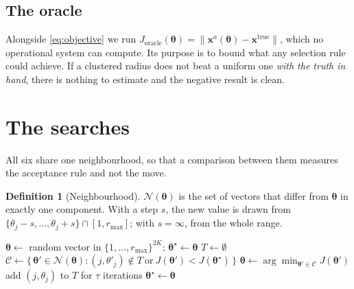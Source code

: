 \documentclass[11pt,a4paper]{article}
\theoremstyle{definition}
\newtheorem*{definition*}{Definition}
\newcommand{\xvec}{\mathbf{x}}
\begin{document}
\subsection{The oracle}

Alongside \eqref{eq:objective} we run
$J_{\text{oracle}}(\boldsymbol{\theta}) = \|\xvec^{a}(\boldsymbol{\theta})
- \xvec^{\text{true}}\|$, which no operational system can compute. Its purpose
is to bound what any selection rule could achieve. If a clustered radius does
not beat a uniform one \emph{with the truth in hand}, there is nothing to
estimate and the negative result is clean.

\section{The searches}

All six share one neighbourhood, so that a comparison between them measures the
acceptance rule and not the move.

\begin{definition*}[Neighbourhood]
$\mathcal{N}(\boldsymbol{\theta})$ is the set of vectors that differ from
$\boldsymbol{\theta}$ in exactly one component. With a step $s$, the new value
is drawn from $\{\theta_j - s, \dots, \theta_j + s\} \cap [1, r_{\max}]$;
with $s = \infty$, from the whole range.
\end{definition*}

\begin{algorithm}[t]
\caption{Tabu search on the integer radius vector}
\begin{algorithmic}[1]
\State $\boldsymbol{\theta} \gets$ random vector in $\{1,\dots,r_{\max}\}^{2K}$;
       $\boldsymbol{\theta}^\star \gets \boldsymbol{\theta}$
\State $T \gets \emptyset$ 
  \State $\mathcal{C} \gets \{\,\boldsymbol{\theta}' \in
         \mathcal{N}(\boldsymbol{\theta}) :
         (j, \theta'_j) \notin T \ \text{or}\
         J(\boldsymbol{\theta}') < J(\boldsymbol{\theta}^\star)\,\}$
         \Comment{aspiration}
  \State $\boldsymbol{\theta} \gets \arg\min_{\boldsymbol{\theta}'
         \in \mathcal{C}} J(\boldsymbol{\theta}')$
  \State add $(j, \theta_j)$ to $T$ for $\tau$ iterations
      $\boldsymbol{\theta}^\star \gets \boldsymbol{\theta}$
  \EndIf
\EndWhile
\end{algorithmic}
\end{algorithm}
\end{document}
